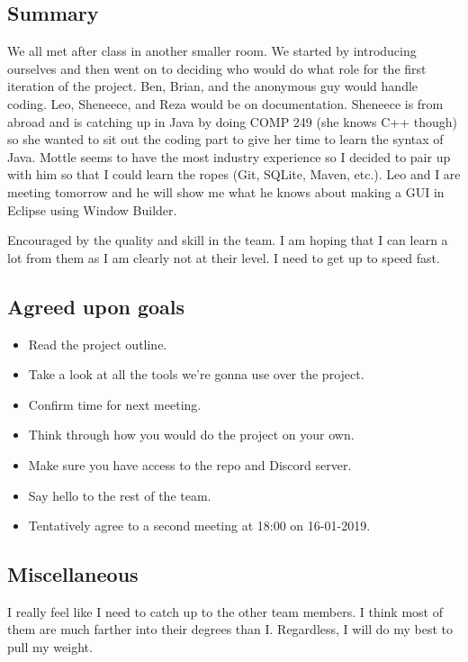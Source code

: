 \documentclass[12pt]{article}
\begin{document}
	\subsection{Summary}
	We all met after class in another smaller room. We started by introducing ourselves and then went on to deciding who would do what role for the first iteration of the project. Ben, Brian, and the anonymous guy would handle coding. Leo, Sheneece, and Reza would be on documentation. Sheneece is from abroad and is catching up in Java by doing COMP 249 (she knows C++ though) so she wanted to sit out the coding part to give her time to learn the syntax of Java. Mottle seems to have the most industry experience so I decided to pair up with him so that I could learn the ropes (Git, SQLite, Maven, etc.). Leo and I are meeting tomorrow and he will show me what he knows about making a GUI in Eclipse using Window Builder.
	
	Encouraged by the quality and skill in the team. I am hoping that I can learn a lot from them as I am clearly not at their level. I need to get up to speed fast.
	
	\subsection{Agreed upon goals}
	\begin{itemize}
		\item Read the project outline.
		\item Take a look at all the tools we're gonna use over the project.
		\item Confirm time for next meeting.
		\item Think through how you would do the project on your own. 
		\item Make sure you have access to the repo and Discord server. 
		\item Say hello to the rest of the team.
		\item Tentatively agree to a second meeting at 18:00 on 16-01-2019.
	\end{itemize}
	
	\subsection{Miscellaneous}
	I really feel like I need to catch up to the other team members. I think most of them are much farther into their degrees than I. Regardless, I will do my best to pull my weight.
	
	\pagebreak
	
\end{document}
